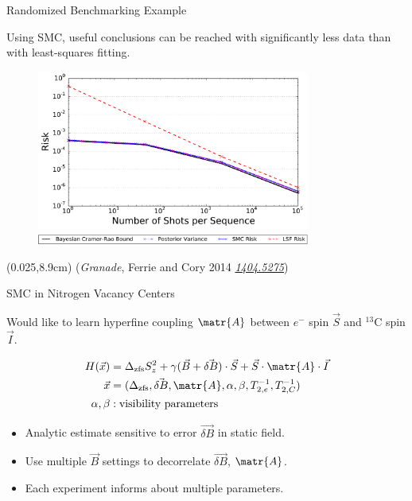 \documentclass[xcolor=dvipsnames, compress]{beamer}
\renewcommand\UrlFont{\color{red}\rmfamily\itshape}
\newcommand{\arxiv}[1]{\href{https://scirate.com/arxiv/#1}{\UrlFont #1}}
\newcommand{\bottomnote}[1]{
  \begin{textblock*}{0.95\paperwidth} (0.025\paperwidth,8.9cm)
    {\tiny \hfill #1}
  \end{textblock*}
}
\begin{document}
\begin{frame}{Randomized Benchmarking Example}

  Using SMC, useful conclusions can be reached with significantly
  less data than with least-squares fitting.

  \begin{figure}
    \centering
    \includegraphics[width=0.8\textwidth]{figures/risk-tr-comparison} \\
    \includegraphics[width=0.8\textwidth]{figures/risk-comparison-legend-crop}
  \end{figure}

  \bottomnote{(\emph{Granade}, Ferrie and Cory 2014 \arxiv{1404.5275})}

\end{frame}

\begin{frame}{SMC in Nitrogen Vacancy Centers}

  Would like to learn hyperfine coupling $\matr{A}$
  between $e^{-}$ spin $\vec{S}$ and ${}^{13}\text{C}$ spin $\vec{I}$.

  \begin{align*}
    H(\vec{x}) & = \Delta_{\text{zfs}} S_z^2 + \gamma (\vec{B} + \vec{\delta B}) \cdot \vec{S} + \vec{S} \cdot \matr{A} \cdot \vec{I} \\
    \vec{x} & = (\Delta_{\text{zfs}}, \vec{\delta B}, \matr{A}, \alpha, \beta, T_{2,e}^{-1}, T_{2,C}^{-1}) \\
    \alpha,\beta & : \text{visibility parameters}
  \end{align*}

  \pause

  \begin{itemize}
    \item Analytic estimate sensitive to error $\vec{\delta B}$ in static field.
    \item Use multiple $\vec{B}$ settings to decorrelate $\vec{\delta B}$, $\matr{A}$.
    \item Each experiment informs about multiple parameters.
  \end{itemize}

\end{frame}
\end{document}
